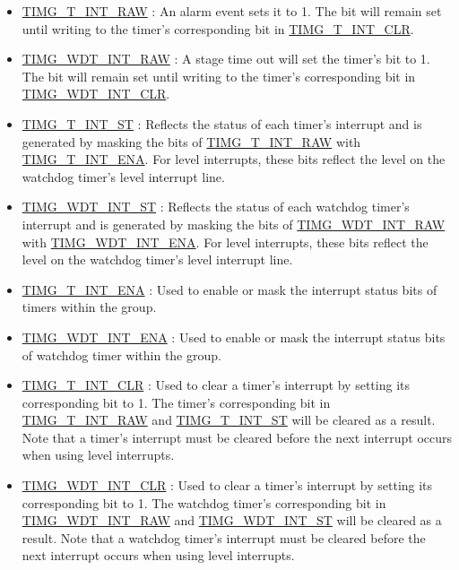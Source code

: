 \documentclass[main\_\_EN.tex]{subfiles}
\begin{document}
\begin{itemize}

\item \hyperref[fielddesc:TIMGTXINTRAW]{TIMG\_T\_INT\_RAW} :
An alarm event sets it to 1. The bit will remain set until writing to the timer's corresponding bit in \hyperref[fielddesc:TIMGTXINTCLR]{TIMG\_T\_INT\_CLR}.
\item \hyperref[fielddesc:TIMGWDTINTRAW]{TIMG\_WDT\_INT\_RAW} : A stage time out will set the timer's bit to 1. The bit will remain set until writing to the timer's corresponding bit in \hyperref[fielddesc:TIMGWDTINTCLR]{TIMG\_WDT\_INT\_CLR}.
\item \hyperref[fielddesc:TIMGTXINTST]{TIMG\_T\_INT\_ST} : Reflects the status of each timer's interrupt and is generated by masking the bits of \hyperref[fielddesc:TIMGTXINTRAW]{TIMG\_T\_INT\_RAW} with \hyperref[fielddesc:TIMGTXINTENA]{TIMG\_T\_INT\_ENA}. For level interrupts, these bits reflect the level on the watchdog timer's level interrupt line.
\item \hyperref[fielddesc:TIMGWDTINTST]{TIMG\_WDT\_INT\_ST} : Reflects the status of each watchdog timer's interrupt and is generated by masking the bits of \hyperref[fielddesc:TIMGWDTINTRAW]{TIMG\_WDT\_INT\_RAW} with \hyperref[fielddesc:TIMGWDTINTENA]{TIMG\_WDT\_INT\_ENA}. For level interrupts, these bits reflect the level on the watchdog timer's level interrupt line.
\item \hyperref[fielddesc:TIMGTXINTENA]{TIMG\_T\_INT\_ENA} : Used to enable or mask the interrupt status bits of timers within the group.
\item \hyperref[fielddesc:TIMGWDTINTENA]{TIMG\_WDT\_INT\_ENA} : Used to enable or mask the interrupt status bits of watchdog timer within the group.
\item \hyperref[fielddesc:TIMGTXINTCLR]{TIMG\_T\_INT\_CLR} : Used to clear a timer's interrupt by setting its corresponding bit to 1. The timer's corresponding bit in \hyperref[fielddesc:TIMGTXINTRAW]{TIMG\_T\_INT\_RAW} and \hyperref[fielddesc:TIMGTXINTST]{TIMG\_T\_INT\_ST} will be cleared as a result. Note that a timer's interrupt must be cleared before the next interrupt occurs when using level interrupts.
\item \hyperref[fielddesc:TIMGWDTINTCLR]{TIMG\_WDT\_INT\_CLR} : Used to clear a timer's interrupt by setting its corresponding bit to 1. The watchdog timer's corresponding bit in \hyperref[fielddesc:TIMGWDTINTRAW]{TIMG\_WDT\_INT\_RAW} and \hyperref[fielddesc:TIMGWDTINTST]{TIMG\_WDT\_INT\_ST} will be cleared as a result. Note that a watchdog timer's interrupt must be cleared before the next interrupt occurs when using level interrupts.
\end{itemize}
\end{document}
